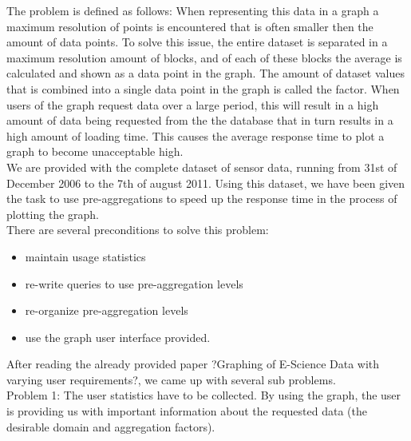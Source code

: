 The problem is defined as follows: When representing this data in a graph a maximum resolution of points is encountered that is often smaller then the amount of data points. To solve this issue, the entire dataset is separated in a maximum resolution amount of blocks, and of each of these blocks the average is calculated and shown as a data point in the graph. The amount of dataset values that is combined into a single data point in the graph is called the factor. When users of the graph request data over a large period, this will result in a high amount of data being requested from the the database that in turn results in a high amount of loading time. This causes the average response time to plot a graph to become unacceptable high.\\



We are provided with the complete dataset of sensor data, running from 31st of December 2006 to the 7th of august 2011. Using this dataset, we have been given the task to use pre-aggregations to speed up the response time in the process of plotting the graph.\\

There are several preconditions to solve this problem:
\begin{itemize}
\item maintain usage statistics 
\item re-write queries to use pre-aggregation levels
\item re-organize pre-aggregation levels
\item use the graph user interface provided.
\end{itemize}

After reading the already provided paper ?Graphing of E-Science Data with varying user requirements?, we came up with several sub problems.\\

Problem 1: The user statistics have to be collected.
By using the graph, the user is providing us with important information about the requested data (the desirable domain and aggregation factors).\\

